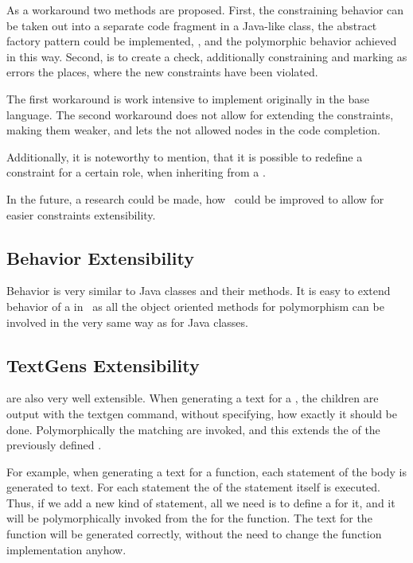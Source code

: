 As a workaround two methods are proposed. First, the constraining behavior can be taken out into a separate code fragment in a Java-like class,
the abstract factory pattern could be implemented, \cite{GOF95}, and the polymorphic behavior achieved in this way.  Second, is to 
create a check, additionally constraining and marking as errors the places, where the new constraints have been violated.

The first workaround is work intensive to implement originally in the base language. The second workaround does not allow for extending the 
constraints, making them weaker, and lets the not allowed nodes in the code completion.


Additionally, it is noteworthy to mention, that it is possible to redefine a constraint for a certain role, when inheriting 
from a .

In the future, a research could be made, how \jbmps\ could be improved to allow for easier constraints extensibility.

\subsection{Behavior Extensibility}

Behavior is very similar to Java classes and their methods. It is easy to extend behavior of a  in \jbmps\
as all the object oriented methods for polymorphism can be involved in the very same way as for Java classes.

\subsection{TextGens Extensibility}

 are also very well extensible. When generating a text for a , the children are output with 
the textgen \mpsid{append} command, without specifying, how exactly it should be done. Polymorphically the 
matching \rgp{textgen} are invoked, and this extends the \rg{textgen} of the previously defined \rg{concept}.

For example, when generating a text for a function, each statement of the body is generated to text. 
For each statement the  of the statement itself is executed. Thus, if we add a new kind of statement,
all we need is to define a  for it, and it will be polymorphically invoked from the  for the
function. The text for the function will be generated correctly, without the need to change the function \rg{textgen}
implementation anyhow.

